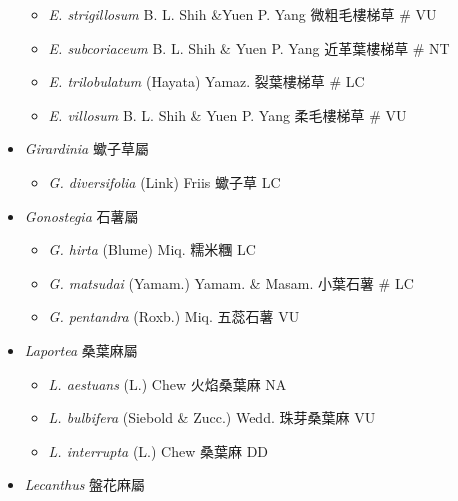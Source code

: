 \begin{itemize}
\begin{itemize}
        \item[] \textit{E. strigillosum} B. L. Shih \&Yuen P. Yang  微粗毛樓梯草  \# VU
        \item[] \textit{E. subcoriaceum} B. L. Shih \& Yuen P. Yang  近革葉樓梯草  \# NT
        \item[] \textit{E. trilobulatum} (Hayata) Yamaz.  裂葉樓梯草  \# LC
        \item[] \textit{E. villosum} B. L. Shih \& Yuen P. Yang  柔毛樓梯草  \# VU
  \end{itemize}
 \item[] \textit{Girardinia} 蠍子草屬
                                
  \begin{itemize}
        \item[] \textit{G. diversifolia} (Link) Friis  蠍子草   LC
  \end{itemize}
 \item[] \textit{Gonostegia} 石薯屬
                                
  \begin{itemize}
        \item[] \textit{G. hirta} (Blume) Miq.  糯米糰   LC
        \item[] \textit{G. matsudai} (Yamam.) Yamam. \& Masam.  小葉石薯  \# LC
        \item[] \textit{G. pentandra} (Roxb.) Miq.  五蕊石薯   VU
  \end{itemize}
 \item[] \textit{Laportea} 桑葉麻屬
                                
  \begin{itemize}
        \item[] \textit{L. aestuans} (L.) Chew  火焰桑葉麻   NA
        \item[] \textit{L. bulbifera} (Siebold \& Zucc.) Wedd.  珠芽桑葉麻   VU
        \item[] \textit{L. interrupta} (L.) Chew  桑葉麻   DD
  \end{itemize}
 \item[] \textit{Lecanthus} 盤花麻屬
                                

\end{itemize}
